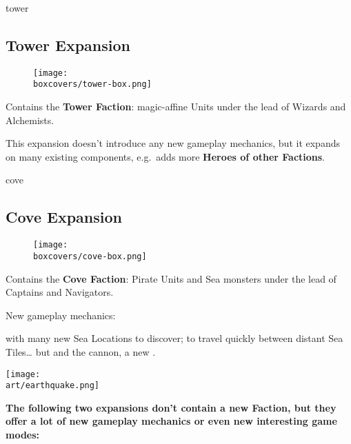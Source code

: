 \begin{multicols}{2}
\begin{expansion}[title=]{tower}
    \subsection*{\color{tower}Tower Expansion}
    \setlength\intextsep{0pt}
    \setlength\columnsep{0.8em}
    \begin{wrapfigure}{l}{0.35\textwidth}
        \texttt{[image: \\boxcovers/tower-box.png]}
    \end{wrapfigure}
    Contains the \textbf{Tower Faction}: magic-affine Units under the lead of Wizards and Alchemists.\par
    \medskip
    This expansion doesn't introduce any new gameplay mechanics, but it expands on many existing components, e.g.~adds more \textbf{Heroes of other Factions}.
\end{expansion}
\vspace*{\fill}
\columnbreak

\begin{expansion}[title=]{cove}
    \subsection*{\color{cove}Cove Expansion}
    \setlength\intextsep{0pt}
    \setlength\columnsep{0.8em}
    \begin{wrapfigure}{l}{0.35\textwidth}
        \texttt{[image: \\boxcovers/cove-box.png]}
    \end{wrapfigure}
    Contains the \textbf{Cove Faction}: Pirate Units and Sea monsters under the lead of Captains and Navigators.\par
    \medskip
    New gameplay mechanics:\par
    \smallskip
     with many new Sea Locations to discover;  to travel quickly between distant Sea Tiles… but  and the cannon, a new .
\end{expansion}

\begin{center}
\hfill{}\texttt{[image: \\art/earthquake.png]}
\end{center}

\end{multicols}

\textbf{The following two expansions don't contain a new Faction, but they offer a lot of new gameplay mechanics or even new interesting game modes:}

